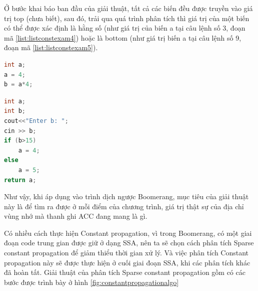 Ở bước khai báo ban đầu của giải thuật, tất cả các biến đều được truyền vào giá trị top (chưa biết), sau đó, trải qua quá trình phân tích thì giá trị của một biến có thể được xác định là hằng số (như giá trị của biến a tại câu lệnh số 3, đoạn mã \ref{list:listconstexam4}) hoặc là bottom (như giá trị biến a tại câu lệnh số 9, đoạn mã \ref{list:listconstexam5}).
\begin{lstlisting}[caption={Đoạn mã ví dụ biến có giá trị là hằng số},label={list:listconstexam4}, language=c++]
int a;
a = 4;
b = a*4;
\end{lstlisting}
\begin{lstlisting}[caption={Đoạn mã ví dụ biến có giá trị là bottom},label={list:listconstexam5}, language=c++]
int a;
int b;
cout<<"Enter b: ";
cin >> b;
if (b>15)
	a = 4;
else
	a = 5;
return a;
\end{lstlisting}

Như vậy, khi áp dụng vào trình dịch ngược Boomerang, mục tiêu của giải thuật này là để tìm ra được ở mỗi điểm của chương trình, giá trị thật sự của địa chỉ vùng nhớ mà thanh ghi ACC đang mang là gì.

Có nhiều cách thực hiện Constant propagation, vì trong Boomerang, có một giai đoạn code trung gian được giữ ở dạng SSA, nên ta sẽ chọn cách phân tích Sparse constant propagation để giảm thiểu thời gian xử lý. Và việc phân tích Constant propagation này sẽ được thực hiện ở cuối giai đoạn SSA, khi các phân tích khác đã hoàn tất. Giải thuật của phân tích Sparse constant propagation gồm có các bước được trình bày ở hình \ref{fig:constantpropagationalgo}

